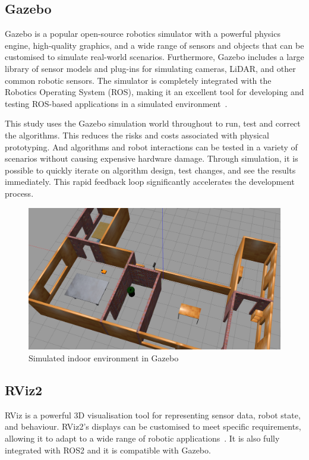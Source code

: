 \subsection{Gazebo}
Gazebo is a popular open-source robotics simulator with a powerful physics engine, high-quality graphics, 
and a wide range of sensors and objects that can be customised to simulate real-world scenarios. 
Furthermore, Gazebo includes a large library of sensor models and plug-ins for simulating cameras, LiDAR, 
and other common robotic sensors. The simulator is completely integrated with the Robotics Operating System (ROS), 
making it an excellent tool for developing and testing ROS-based applications in a simulated environment~\cite{gazebo}. 

This study uses the Gazebo simulation world throughout to run, test and correct the algorithms. 
This reduces the risks and costs associated with physical prototyping. 
And algorithms and robot interactions can be tested in a variety of scenarios without causing expensive hardware damage. 
Through simulation, it is possible to quickly iterate on algorithm design, test changes, and see the results immediately. 
This rapid feedback loop significantly accelerates the development process.
\begin{figure}[H]
    \centering
    \includegraphics[width=0.76\linewidth]{figs/gazebo_house.png}
    \caption{Simulated indoor environment in Gazebo}
\end{figure}
\subsection{RViz2}
RViz is a powerful 3D visualisation tool for representing sensor data, robot state, and behaviour.
RViz2's displays can be customised to meet specific requirements, 
allowing it to adapt to a wide range of robotic applications~\cite{rviz2}. 
It is also fully integrated with ROS2 and it is compatible with Gazebo. 

